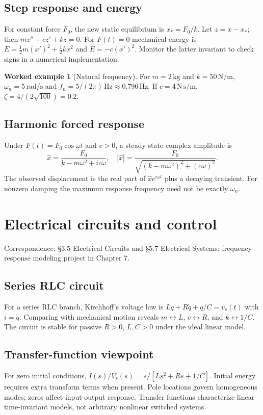 \documentclass[11pt,letterpaper,oneside]{report}
\theoremstyle{definition}\newtheorem{definition}[theorem]{Definition}
\newtheorem{example}[theorem]{Worked example}
\theoremstyle{remark}\newtheorem{remark}[theorem]{Remark}
\begin{document}
\section{Step response and energy}
For constant force $F_0$, the new static equilibrium is $x_*=F_0/k$. Let $z=x-x_*$; then $m z''+cz'+kz=0$. For $F(t)=0$ mechanical energy is $E=\frac12m(x')^2+\frac12kx^2$ and $\dot E=-c(x')^2$. Monitor the latter invariant to check signs in a numerical implementation.
\begin{example}[Natural frequency]
For $m=2\,\mathrm{kg}$ and $k=50\,\mathrm{N/m}$, $\omega_n=5\,\mathrm{rad/s}$ and $f_n=5/(2\pi)\,\mathrm{Hz}\approx0.796\,\mathrm{Hz}$. If $c=4\,\mathrm{N\,s/m}$, $\zeta=4/(2\sqrt{100})=0.2$.
\end{example}
\section{Harmonic forced response}
Under $F(t)=F_0\cos\omega t$ and $c>0$, a steady-state complex amplitude is
\[\hat x=\frac{F_0}{k-m\omega^2+i c\omega},\quad |\hat x|=\frac{F_0}{\sqrt{(k-m\omega^2)^2+(c\omega)^2}}.\]
The observed displacement is the real part of $\hat x e^{i\omega t}$ plus a decaying transient. For nonzero damping the maximum response frequency need not be exactly $\omega_n$.
\chapter{Electrical circuits and control}
\begin{bookground}Correspondence: \S3.5 Electrical Circuits and \S5.7 Electrical Systems; frequency-response modeling project in Chapter 7.\end{bookground}
\section{Series RLC circuit}
For a series RLC branch, Kirchhoff's voltage law is $L\ddot q+R\dot q+q/C=v_s(t)$ with $i=\dot q$. Comparing with mechanical motion reveals $m\leftrightarrow L$, $c\leftrightarrow R$, and $k\leftrightarrow1/C$. The circuit is stable for passive $R>0$, $L,C>0$ under the ideal linear model.
\section{Transfer-function viewpoint}
For zero initial conditions, $I(s)/V_s(s)=s/[Ls^2+Rs+1/C]$. Initial energy requires extra transform terms when present. Pole locations govern homogeneous modes; zeros affect input-output response. Transfer functions characterize linear time-invariant models, not arbitrary nonlinear switched systems.
\end{document}
